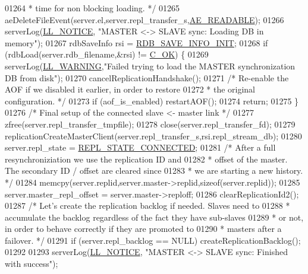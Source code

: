 \begin{DoxyCode}
{{{{{{{{{{{{{{{{{{{{{{{{{{{{{{{{{{{{{{{{{{{{{{{{01264 \textcolor{comment}{         * time for non blocking loading. */}
01265         aeDeleteFileEvent(server.el,server.repl\_transfer\_s,\hyperlink{ae_8h_a7a9a2162d007d09739955b4e55c65bf3}{AE\_READABLE});
01266         serverLog(\hyperlink{server_8h_a8c54c191e436c7dd3012167212692401}{LL\_NOTICE}, \textcolor{stringliteral}{"MASTER <-> SLAVE sync: Loading DB in memory"});
01267         rdbSaveInfo rsi = \hyperlink{server_8h_a694b5ed5268bee8c50cc5b38fbec99ce}{RDB\_SAVE\_INFO\_INIT};
01268         \textcolor{keywordflow}{if} (rdbLoad(server.rdb\_filename,&rsi) != \hyperlink{server_8h_a303769ef1065076e68731584e758d3e1}{C\_OK}) \{
01269             serverLog(\hyperlink{server_8h_a31229b9334bba7d6be2a72970967a14b}{LL\_WARNING},\textcolor{stringliteral}{"Failed trying to load the MASTER synchronization DB from
       disk"});
01270             cancelReplicationHandshake();
01271             \textcolor{comment}{/* Re-enable the AOF if we disabled it earlier, in order to restore}
01272 \textcolor{comment}{             * the original configuration. */}
01273             \textcolor{keywordflow}{if} (aof\_is\_enabled) restartAOF();
01274             \textcolor{keywordflow}{return};
01275         \}
01276         \textcolor{comment}{/* Final setup of the connected slave <- master link */}
01277         zfree(server.repl\_transfer\_tmpfile);
01278         close(server.repl\_transfer\_fd);
01279         replicationCreateMasterClient(server.repl\_transfer\_s,rsi.repl\_stream\_db);
01280         server.repl\_state = \hyperlink{server_8h_aed693b3a9cdfc05cf5ab7551a8c86fbe}{REPL\_STATE\_CONNECTED};
01281         \textcolor{comment}{/* After a full resynchroniziation we use the replication ID and}
01282 \textcolor{comment}{         * offset of the master. The secondary ID / offset are cleared since}
01283 \textcolor{comment}{         * we are starting a new history. */}
01284         memcpy(server.replid,server.master->replid,\textcolor{keyword}{sizeof}(server.replid));
01285         server.master\_repl\_offset = server.master->reploff;
01286         clearReplicationId2();
01287         \textcolor{comment}{/* Let's create the replication backlog if needed. Slaves need to}
01288 \textcolor{comment}{         * accumulate the backlog regardless of the fact they have sub-slaves}
01289 \textcolor{comment}{         * or not, in order to behave correctly if they are promoted to}
01290 \textcolor{comment}{         * masters after a failover. */}
01291         \textcolor{keywordflow}{if} (server.repl\_backlog == NULL) createReplicationBacklog();
01292 
01293         serverLog(\hyperlink{server_8h_a8c54c191e436c7dd3012167212692401}{LL\_NOTICE}, \textcolor{stringliteral}{"MASTER <-> SLAVE sync: Finished with success"});
}}}}}}}}}}}}}}}}}}}}}}}}}}}}}}}}}}}}}}}}}}}}}}}}
\end{DoxyCode}
